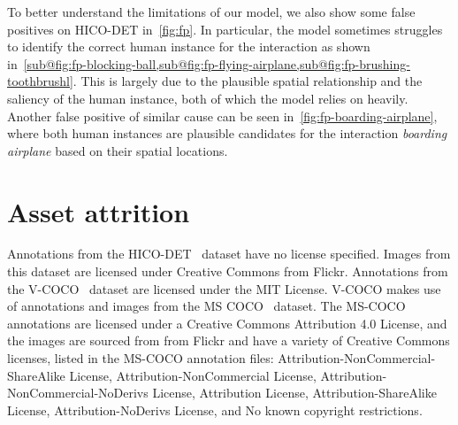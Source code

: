 \documentclass[10pt,twocolumn,letterpaper]{article}
\begin{document}
To better understand the limitations of our model, we also show some false positives on HICO-DET in~\cref{fig:fp}. In particular, the model sometimes struggles to identify the correct human instance for the interaction as shown in~\cref{sub@fig:fp-blocking-ball,sub@fig:fp-flying-airplane,sub@fig:fp-brushing-toothbrushl}. This is largely due to the plausible spatial relationship and the saliency of the human instance, both of which the model relies on heavily. Another false positive of similar cause can be seen in~\cref{fig:fp-boarding-airplane}, where both human instances are plausible candidates for the interaction \textit{boarding airplane} based on their spatial locations.

\section{Asset attrition}
Annotations from the HICO-DET~\cite{hicodet} dataset have no license specified. Images from this dataset are licensed under Creative Commons from Flickr. Annotations from the V-COCO~\cite{vcoco} dataset are licensed under the MIT License. V-COCO makes use of annotations and images from the MS COCO~\cite{coco} dataset. The MS-COCO annotations are licensed under a Creative Commons Attribution 4.0 License, and the images are sourced from from Flickr and have a variety of Creative Commons licenses, listed in the MS-COCO annotation files: Attribution-NonCommercial-ShareAlike License, Attribution-NonCommercial License, Attribution-NonCommercial-NoDerivs License, Attribution License, Attribution-ShareAlike License, Attribution-NoDerivs License, and No known copyright restrictions.
\end{document}
